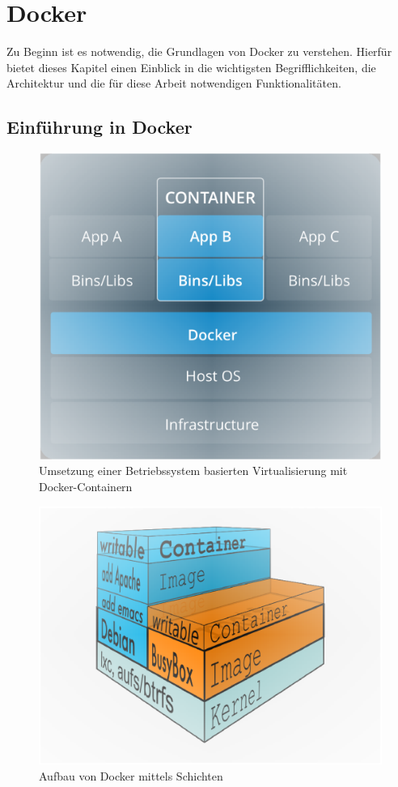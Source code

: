 \chapter{Docker}
\label{c:docker}
Zu Beginn ist es notwendig, die Grundlagen von Docker zu verstehen. Hierfür bietet dieses Kapitel einen Einblick in die wichtigsten Begrifflichkeiten, die Architektur und die für diese Arbeit notwendigen Funktionalitäten.
\section{Einführung in Docker}
\label{c:einführung}
\begin{figure}
	\centering
	\includegraphics[width=0.7\linewidth]{figures/Docker}
	\caption[Betriebssystem Virtualisierung mit Docker-Containern]{Umsetzung einer Betriebssystem basierten Virtualisierung mit Docker-Containern}
	\label{fig:docker}
\end{figure}
\begin{figure}
	\centering
	\includegraphics[width=0.7\linewidth]{figures/DockerLayer}
	\caption[Aufbau von Docker mittels Schichten]{Aufbau von Docker mittels Schichten}
	\label{fig:dockerlayer}
\end{figure}
